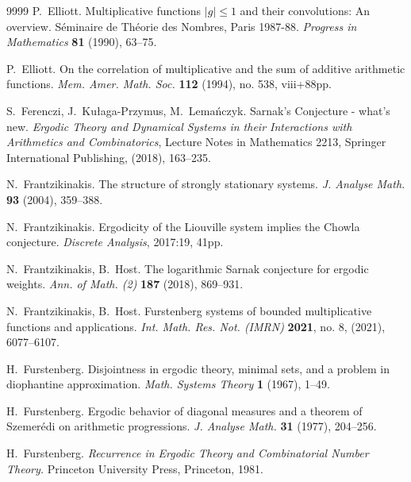 \documentclass[11pt]{amsart}
\theoremstyle{definition}
\begin{document}
\begin{thebibliography}{9999}
	 P.~Elliott. Multiplicative functions $|g|\leq 1$ and their convolutions: An overview.
S\'eminaire de Th\'eorie des Nombres, Paris 1987-88.
{\em Progress in Mathematics} {\bf  81} (1990), 63--75.

 P.~Elliott. On the correlation of multiplicative and the sum of additive arithmetic functions. {\em Mem. Amer. Math. Soc. } {\bf 112} (1994), no. 538, viii+88pp.


	S.~Ferenczi, J.~Ku\l aga-Przymus, M.~Lema\'nczyk.
Sarnak’s Conjecture - what’s new.
{\em Ergodic Theory and Dynamical Systems in their Interactions with Arithmetics and Combinatorics},
Lecture Notes in Mathematics 2213, Springer International Publishing, (2018), 163--235.

	
	 N.~Frantzikinakis.
	The structure of strongly stationary systems.
	{\em J. Analyse Math.} \textbf{93} (2004), 359--388.
	
	
	
	 N.~Frantzikinakis. Ergodicity of the Liouville system implies the Chowla conjecture.
	{\em Discrete Analysis}, 2017:19, 41pp.
	
	
	
	N.~Frantzikinakis, B.~Host.
	The logarithmic Sarnak conjecture for ergodic weights.
	{\em Ann. of Math. (2)} {\bf 187} (2018), 869--931.
	
	
	
	N.~Frantzikinakis, B.~Host.
	Furstenberg systems of bounded multiplicative functions and applications.
	{\em Int. Math. Res. Not. (IMRN)}   {\bf 2021}, no. 8, (2021), 6077--6107.
	
	
	 H.~Furstenberg.
	Disjointness in ergodic theory, minimal sets, and a problem in diophantine approximation.
	{\em Math. Systems Theory} {\bf 1} (1967), 1--49.
	
	 H.~Furstenberg.
	Ergodic behavior of diagonal measures and a theorem of Szemer\'edi
	on arithmetic progressions. {\em J. Analyse Math.} \textbf{31}
	(1977), 204--256.
	
	
	H.~Furstenberg.
	{\em Recurrence in Ergodic Theory and Combinatorial
		Number Theory.}  Princeton University Press, Princeton, 1981.
	
	
	
	
	

\end{thebibliography}
\end{document}
